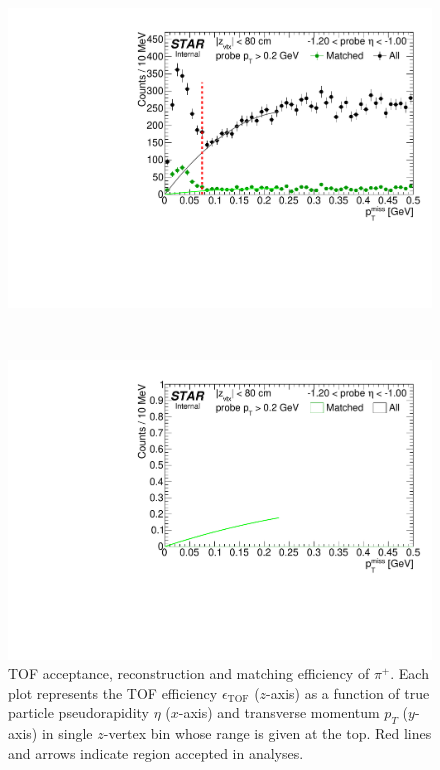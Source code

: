 \begin{figure}%
\caption[TOF acceptance, reconstruction and matching efficiency of $\pi^{+}$.]{TOF acceptance, reconstruction and matching efficiency of $\pi^{+}$. Each plot represents the TOF efficiency $\epsilon_{\text{TOF}}$ ($z$-axis) as a function of true particle pseudorapidity $\eta$ ($x$-axis) and transverse momentum $p_{T}$ ($y$-axis) in single $z$-vertex bin whose range is given at the top. Red lines and arrows indicate region accepted in analyses.}\label{fig:tagAndProbeTofEffFits_Eta}
\centering
\parbox{0.495\textwidth}{
  \centering
  \includegraphics[width=\linewidth,page=2]{graphics/systematicsEfficiency/TOF_tagAndProbe/Fitting_effVsEta_data.pdf}
}~
\parbox{0.495\textwidth}{
  \centering
  \includegraphics[width=\linewidth,page=2]{graphics/systematicsEfficiency/TOF_tagAndProbe/Fitting_effVsEta_mc.pdf}
}%
\end{figure}
